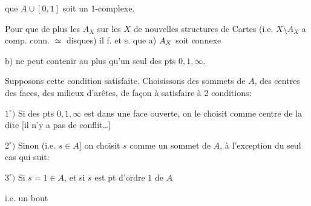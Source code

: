 que $A\cup[0,1]$ soit un $1$-complexe.

Pour que de plus les $A_X$ 
sur les $X$ de nouvelles structures de
Cartes (i.e. $X\setminus A_X$ a comp. conn. $\simeq$ disques)
il f. et s. que a) $A_{X}$ soit connexe
\par
{}\par
{}\par
{}\par
{}

b)    
ne peut contenir au plus qu'un seul
des pts $0,1,\infty$.

Supposons cette condition satisfaite. Choisissons
des sommets de $A$,  des centres des
faces, des milieux d'arêtes, de façon
à satisfaire à $2$ conditions:

$1^\circ)$ Si  des pts $0,1,\infty$ est dans une
face ouverte, on le choisit comme
centre de la dite [il n'y a pas de conflit\ldots]

$2^\circ)$ Sinon (i.e.  $s\in A$] on choisit $s$
comme un sommet de $A$,  à l'exception
du seul cas qui suit:

$3^\circ)$ Si $s=1\in A$, et si $s$ est   pt
d'ordre $1$ de $A$\par
i.e. un bout
